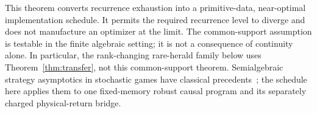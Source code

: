 This theorem converts recurrence exhaustion into a primitive-data, near-optimal implementation schedule. It permits the required recurrence level to diverge and does not manufacture an optimizer at the limit. The common-support assumption is testable in the finite algebraic setting; it is not a consequence of continuity alone. In particular, the rank-changing rare-herald family below uses Theorem~\ref{thm:transfer}, not this common-support theorem. Semialgebraic strategy asymptotics in stochastic games have classical precedents~\cite{BewleyKohlberg,BewleyKohlbergStationary}; the schedule here applies them to one fixed-memory robust causal program and its separately charged physical-return bridge.
